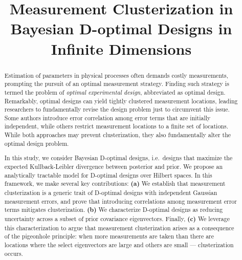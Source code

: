 \documentclass[ba]{imsart}
\theoremstyle{plain}
\theoremstyle{definition}
\theoremstyle{remark}
\begin{document}
\begin{frontmatter}
\title{Measurement Clusterization in Bayesian D-optimal Designs in Infinite Dimensions}



\begin{aug}
\author{ }

\address[addr1]{Azrieli Faculty of Medicine, Bar-Ilan University, Safed, Israel
     }

\end{aug}

\begin{abstract}
  Estimation of parameters in physical processes often demands costly measurements, prompting the pursuit of an optimal measurement strategy. Finding such strategy is termed the problem of \emph{optimal experimental design}, abbreviated as optimal design. Remarkably, optimal designs can yield tightly clustered measurement locations, leading researchers to fundamentally revise the design problem just to circumvent this issue. Some authors introduce error correlation among error terms that are initially independent, while others restrict measurement locations to a finite set of locations. While both approaches may prevent clusterization, they also fundamentally alter the optimal design problem.

In this study, we consider Bayesian D-optimal designs, i.e.~designs that maximize the expected Kullback-Leibler divergence between posterior and prior. We propose an analytically tractable model for D-optimal designs over Hilbert spaces. In this framework, we make several key contributions: \textbf{(a)} We establish that measurement clusterization is a generic trait of D-optimal designs with independent Gaussian measurement errors, and prove that introducing correlations among measurement error terms mitigates clusterization. \textbf{(b)} We characterize D-optimal designs as reducing uncertainty across a subset of prior covariance eigenvectors. Finally, \textbf{(c)} We leverage this characterization to argue that measurement clusterization arises as a consequence of the pigeonhole principle: when more measurements are taken than there are locations where the select eigenvectors are large and others are small --- clusterization occurs. 
 \end{abstract}

\begin{keyword}[class=MSC]
\end{keyword}

\end{frontmatter}
\end{document}
